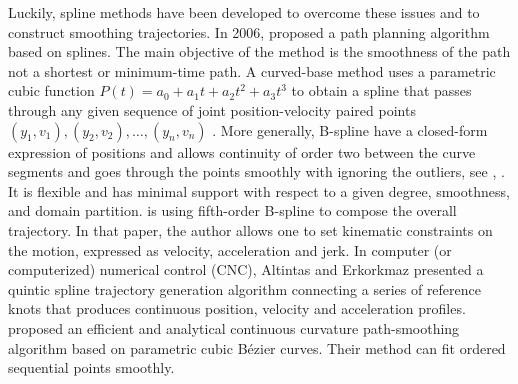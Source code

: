 Luckily, spline methods have been developed to overcome these issues and to construct smoothing trajectories.  In 2006, \cite{magid2006spline} proposed a path planning algorithm based on splines. The main objective of the method is the smoothness of the path not a shortest or minimum-time path. A curved-base method uses a parametric cubic function $P(t)=a_0+a_1t+a_2t^2+a_3t^3$ to obtain a spline that passes through any given sequence of joint position-velocity paired points $(y_1, v_1), (y_2, v_2), \ldots, (y_n,v_n)$ \cite{yu2004curve}. More generally, B-spline have a closed-form expression of positions and allows continuity of order two between the curve segments and goes through the points smoothly with ignoring the outliers, see \eg \cite{komoriya1989trajectory}, \cite{ben2004geometric}. It is flexible and has minimal support with respect to a given degree, smoothness, and domain partition. \cite{gasparetto2007new} is using fifth-order B-spline to compose the overall trajectory. In that paper, the author allows one to set kinematic constraints on the motion, expressed as velocity, acceleration and jerk. In computer (or computerized) numerical control (CNC), Altintas and Erkorkmaz \cite{erkorkmaz2001high} presented a quintic spline trajectory generation algorithm connecting a series of reference knots that produces continuous position, velocity and acceleration profiles. \cite{yang2010analytical} proposed an efficient and analytical continuous curvature path-smoothing algorithm based on parametric cubic B\'{e}zier curves. Their method can fit ordered sequential points smoothly. 


